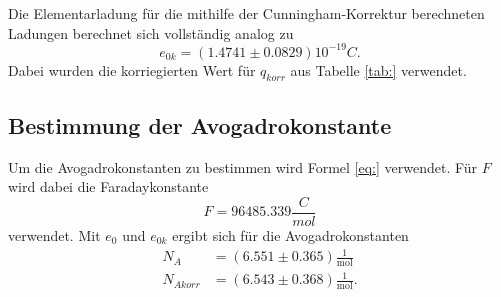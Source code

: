 Die Elementarladung für die mithilfe der Cunningham-Korrektur berechneten Ladungen berechnet sich vollständig analog zu 
\begin{equation*}
    e_{0k}=(1.4741 \pm 0.0829) 10^{-19}C .
\end{equation*}
Dabei wurden die korriegierten Wert für $q_{korr}$ aus Tabelle \ref{tab:} verwendet.
\subsection{Bestimmung der Avogadrokonstante}
Um die Avogadrokonstanten zu bestimmen wird Formel \ref{eq:} verwendet.
Für $F$ wird dabei die Faradaykonstante
\begin{equation*}
    F= 96485.339 \frac{C}{mol}
\end{equation*}
verwendet.
Mit $e_0$ und $e_{0k}$ ergibt sich für die Avogadrokonstanten
\begin{align*}
    N_A&= (6.551 \pm 0.365) \frac{1}{\text{mol}} \\
    N_{Akorr}&= (6.543 \pm 0.368) \frac{1}{\text{mol}}.
\end{align*}

